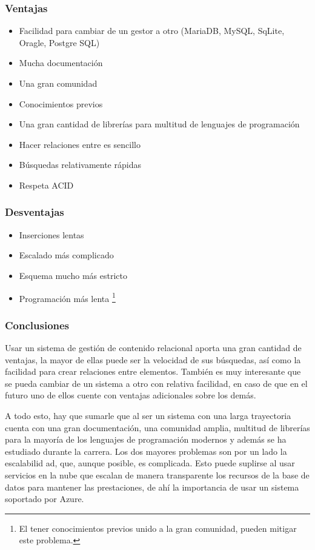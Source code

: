\subsubsection{Ventajas}
\begin{itemize}
    \item Facilidad para cambiar de un gestor a otro (MariaDB, MySQL, SqLite, Oragle, Postgre SQL)
    \item Mucha documentación
    \item Una gran comunidad
    \item Conocimientos previos
    \item Una gran cantidad de librerías para multitud de lenguajes de programación
    \item Hacer relaciones entre es sencillo
    \item Búsquedas relativamente rápidas
    \item Respeta ACID
\end{itemize}

\subsubsection{Desventajas}
\begin{itemize}
    \item Inserciones lentas
    \item Escalado más complicado
    \item Esquema mucho más estricto
    \item Programación más lenta \footnote{El tener conocimientos previos unido a la gran comunidad, pueden mitigar este problema.}
\end{itemize}

\subsubsection{Conclusiones}

Usar un sistema de gestión de contenido relacional aporta una gran cantidad de ventajas, la mayor de ellas puede ser la velocidad de sus búsquedas, así como la facilidad para crear relaciones entre elementos. También es muy interesante que se pueda cambiar de un sistema a otro con relativa facilidad, en caso de que en el futuro uno de ellos cuente con ventajas adicionales sobre los demás. 

A todo esto, hay que sumarle que al ser un sistema con una larga trayectoria cuenta con una gran documentación, una comunidad amplia, multitud de librerías para la mayoría de los lenguajes de programación modernos y además se ha estudiado durante la carrera.
Los dos mayores problemas son por un lado la escalabilid
ad, que, aunque posible, es complicada. Esto puede suplirse al usar servicios en la nube que escalan de manera transparente los recursos de la base de datos para mantener las prestaciones, de ahí la importancia de usar un sistema soportado por Azure. 

